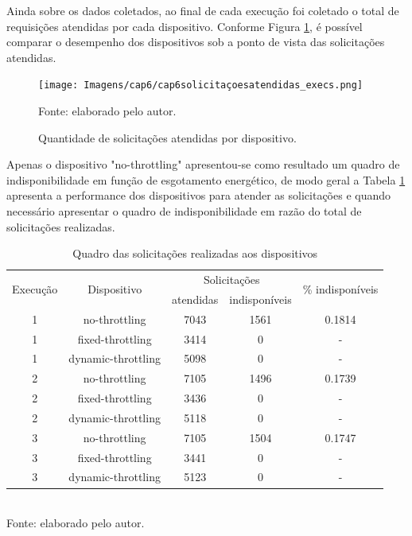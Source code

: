 Ainda sobre os dados coletados, ao final de cada execução foi coletado o total de requisições atendidas por cada dispositivo. Conforme Figura \ref{fig:cap6solicitacoesatendidas}, é possível comparar o desempenho dos dispositivos sob a ponto de vista das solicitações atendidas.

\begin{figure}[H]
	\centering	
	\caption{Quantidade de solicitações atendidas por dispositivo.} 
	\label{fig:cap6solicitacoesatendidas}
	\noindent\texttt{[image: Imagens/cap6/cap6solicitaçoesatendidas\_execs.png]} 
	
	Fonte: elaborado pelo autor.
\end{figure}

Apenas o dispositivo "no-throttling" apresentou-se como resultado um quadro de indisponibilidade em função de esgotamento energético, de modo geral a Tabela \ref{table:cap6:quadrogeralobtido} apresenta a performance dos dispositivos para atender as solicitações e quando necessário apresentar o quadro de indisponibilidade em razão do total de solicitações realizadas.

\begingroup
\begin{table}[H]
	\centering
	\caption{Quadro das solicitações realizadas aos dispositivos}
	\begin{tabular}{|c |c |c|c|c|}
		\hline
		\multirow{2}{*}{Execução} & 
		\multirow{2}{*}{Dispositivo} &
		\multicolumn{2}{c|}{Solicitações} & 
		\multirow{2}{*}{\% indisponíveis} \\
		& & atendidas & indisponíveis & \\
		\midrule
		1& 	no-throttling 	&  7043&1561 & 0.1814\\
		1& 	fixed-throttling &  3414&0 & -\\
		1&	dynamic-throttling & 5098 & 0 &-\\
		
		2& no-throttling &  7105&1496 & 0.1739\\
		2& fixed-throttling & 3436& 0 & -\\
		2& dynamic-throttling & 5118& 0 &-\\
		
	   3  &	no-throttling & 7105& 1504& 0.1747\\
	   3	& fixed-throttling &3441 & 0& -\\
	   3	& dynamic-throttling & 5123& 0&-\\
		
		\bottomrule
	\end{tabular}
		\label{table:cap6:quadrogeralobtido}
		\\
		\footnotesize Fonte: elaborado pelo autor.
\end{table}
\endgroup

